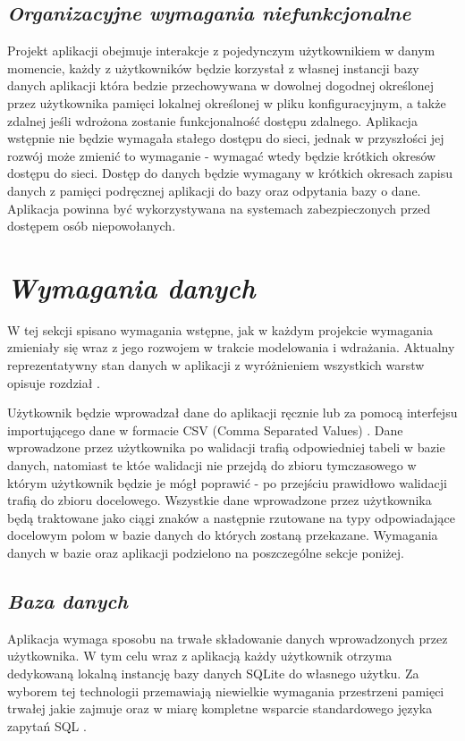 \documentclass[a4paper,10pt, twoside]{report}
\newcommand{\customstylechapter}[1]{\large{\textit{#1}}}
\newcommand{\customstylesection}[1]{\textbf{\textit{#1}}}
\begin{document}
\section{\customstylesection{Organizacyjne wymagania niefunkcjonalne}}
{Projekt aplikacji obejmuje interakcje z pojedynczym użytkownikiem w danym 
momencie, każdy z użytkowników będzie korzystał z własnej instancji bazy 
danych aplikacji która bedzie przechowywana w dowolnej dogodnej określonej 
przez użytkownika pamięci lokalnej określonej w pliku konfiguracyjnym, a także 
zdalnej jeśli wdrożona zostanie funkcjonalność dostępu zdalnego. Aplikacja 
wstępnie nie będzie wymagała stałego dostępu do sieci, jednak w przyszłości 
jej rozwój może zmienić to wymaganie - wymagać wtedy będzie krótkich okresów 
dostępu do sieci. Dostęp do danych będzie wymagany w krótkich okresach zapisu 
danych z pamięci podręcznej aplikacji do bazy oraz odpytania bazy o dane. 
Aplikacja powinna być wykorzystywana na systemach zabezpieczonych przed dostępem
 osób niepowołanych.}

\chapter{\customstylechapter{Wymagania danych}}
{W tej sekcji spisano wymagania wstępne, jak w każdym projekcie wymagania 
zmieniały się wraz z jego rozwojem w trakcie modelowania i 
wdrażania. Aktualny reprezentatywny stan danych w aplikacji z wyróżnieniem 
wszystkich warstw opisuje rozdział .}

{Użytkownik będzie wprowadzał dane do aplikacji ręcznie lub za pomocą interfejsu
importującego dane w formacie CSV (Comma Separated Values) \cite{CSV}. Dane 
wprowadzone przez użytkownika po walidacji trafią odpowiedniej tabeli w bazie 
danych, natomiast te któe walidacji nie przejdą do zbioru tymczasowego w którym 
użytkownik będzie je mógł poprawić - po przejściu prawidłowo walidacji trafią 
do zbioru docelowego. Wszystkie dane wprowadzone przez użytkownika będą 
traktowane jako ciągi znaków a następnie rzutowane na typy odpowiadające 
docelowym polom w bazie danych do których zostaną przekazane. Wymagania 
danych w bazie oraz aplikacji podzielono na poszczególne sekcje poniżej.}

\section{\customstylesection{Baza danych}}
{Aplikacja wymaga sposobu na trwałe składowanie danych wprowadzonych przez 
użytkownika. W tym celu wraz z aplikacją każdy użytkownik otrzyma dedykowaną 
lokalną instancję bazy danych SQLite \cite{SQLite} do własnego użytku. Za 
wyborem tej technologii przemawiają niewielkie wymagania przestrzeni pamięci 
trwałej jakie zajmuje oraz w miarę kompletne wsparcie standardowego języka 
zapytań SQL \cite{SQL}.}
\end{document}
